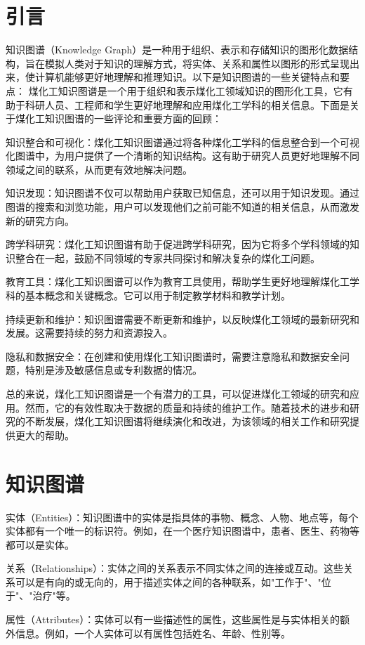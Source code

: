\section{引言}
知识图谱（Knowledge Graph）是一种用于组织、表示和存储知识的图形化数据结构，旨在模拟人类对于知识的理解方式，将实体、关系和属性以图形的形式呈现出来，使计算机能够更好地理解和推理知识。以下是知识图谱的一些关键特点和要点：
煤化工知识图谱是一个用于组织和表示煤化工领域知识的图形化工具，它有助于科研人员、工程师和学生更好地理解和应用煤化工学科的相关信息。下面是关于煤化工知识图谱的一些评论和重要方面的回顾：

知识整合和可视化：煤化工知识图谱通过将各种煤化工学科的信息整合到一个可视化图谱中，为用户提供了一个清晰的知识结构。这有助于研究人员更好地理解不同领域之间的联系，从而更有效地解决问题。

知识发现：知识图谱不仅可以帮助用户获取已知信息，还可以用于知识发现。通过图谱的搜索和浏览功能，用户可以发现他们之前可能不知道的相关信息，从而激发新的研究方向。

跨学科研究：煤化工知识图谱有助于促进跨学科研究，因为它将多个学科领域的知识整合在一起，鼓励不同领域的专家共同探讨和解决复杂的煤化工问题。

教育工具：煤化工知识图谱可以作为教育工具使用，帮助学生更好地理解煤化工学科的基本概念和关键概念。它可以用于制定教学材料和教学计划。

持续更新和维护：知识图谱需要不断更新和维护，以反映煤化工领域的最新研究和发展。这需要持续的努力和资源投入。

隐私和数据安全：在创建和使用煤化工知识图谱时，需要注意隐私和数据安全问题，特别是涉及敏感信息或专利数据的情况。

总的来说，煤化工知识图谱是一个有潜力的工具，可以促进煤化工领域的研究和应用。然而，它的有效性取决于数据的质量和持续的维护工作。随着技术的进步和研究的不断发展，煤化工知识图谱将继续演化和改进，为该领域的相关工作和研究提供更大的帮助。

\section{知识图谱}

实体（Entities）：知识图谱中的实体是指具体的事物、概念、人物、地点等，每个实体都有一个唯一的标识符。例如，在一个医疗知识图谱中，患者、医生、药物等都可以是实体。

关系（Relationships）：实体之间的关系表示不同实体之间的连接或互动。这些关系可以是有向的或无向的，用于描述实体之间的各种联系，如"工作于"、"位于"、"治疗"等。

属性（Attributes）：实体可以有一些描述性的属性，这些属性是与实体相关的额外信息。例如，一个人实体可以有属性包括姓名、年龄、性别等。

